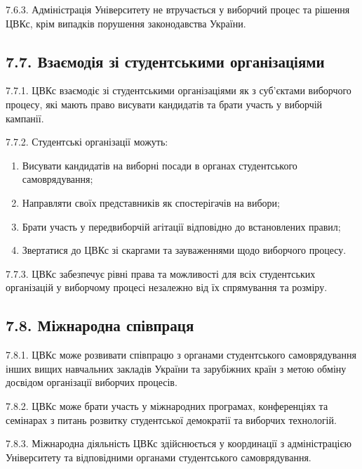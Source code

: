     7.6.3. Адміністрація Університету не втручається у виборчий процес та рішення ЦВКс, крім випадків порушення законодавства України.

\subsection*{7.7. Взаємодія зі студентськими організаціями}
    7.7.1. ЦВКс взаємодіє зі студентськими організаціями як з суб'єктами виборчого процесу, які мають право висувати кандидатів та брати участь у виборчій кампанії.

    7.7.2. Студентські організації можуть:

        \begin{enumerate}[label=\alph*)]
            \item Висувати кандидатів на виборні посади в органах студентського самоврядування;
            \item Направляти своїх представників як спостерігачів на вибори;
            \item Брати участь у передвиборчій агітації відповідно до встановлених правил;
            \item Звертатися до ЦВКс зі скаргами та зауваженнями щодо виборчого процесу.
        \end{enumerate}

    7.7.3. ЦВКс забезпечує рівні права та можливості для всіх студентських організацій у виборчому процесі незалежно від їх спрямування та розміру.

\subsection*{7.8. Міжнародна співпраця}
    7.8.1. ЦВКс може розвивати співпрацю з органами студентського самоврядування інших вищих навчальних закладів України та зарубіжних країн з метою обміну досвідом організації виборчих процесів.

    7.8.2. ЦВКс може брати участь у міжнародних програмах, конференціях та семінарах з питань розвитку студентської демократії та виборчих технологій.

    7.8.3. Міжнародна діяльність ЦВКс здійснюється у координації з адміністрацією Університету та відповідними органами студентського самоврядування.